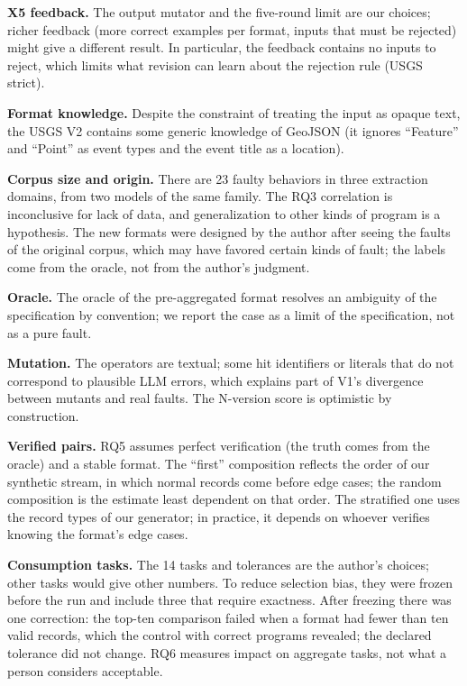 \documentclass[sigconf,nonacm]{acmart}
\begin{document}
\textbf{X5 feedback.} The output mutator and the five-round limit are our choices; richer feedback (more correct examples per format, inputs that must be rejected) might give a different result. In particular, the feedback contains no inputs to reject, which limits what revision can learn about the rejection rule (USGS strict).

\textbf{Format knowledge.} Despite the constraint of treating the input as opaque text, the USGS V2 contains some generic knowledge of GeoJSON (it ignores ``Feature'' and ``Point'' as event types and the event title as a location).

\textbf{Corpus size and origin.} There are 23 faulty behaviors in three extraction domains, from two models of the same family. The RQ3 correlation is inconclusive for lack of data, and generalization to other kinds of program is a hypothesis. The new formats were designed by the author after seeing the faults of the original corpus, which may have favored certain kinds of fault; the labels come from the oracle, not from the author's judgment.

\textbf{Oracle.} The oracle of the pre-aggregated format resolves an ambiguity of the specification by convention; we report the case as a limit of the specification, not as a pure fault.

\textbf{Mutation.} The operators are textual; some hit identifiers or literals that do not correspond to plausible LLM errors, which explains part of V1's divergence between mutants and real faults. The N-version score is optimistic by construction.

\textbf{Verified pairs.} RQ5 assumes perfect verification (the truth comes from the oracle) and a stable format. The ``first'' composition reflects the order of our synthetic stream, in which normal records come before edge cases; the random composition is the estimate least dependent on that order. The stratified one uses the record types of our generator; in practice, it depends on whoever verifies knowing the format's edge cases.

\textbf{Consumption tasks.} The 14 tasks and tolerances are the author's choices; other tasks would give other numbers. To reduce selection bias, they were frozen before the run and include three that require exactness. After freezing there was one correction: the top-ten comparison failed when a format had fewer than ten valid records, which the control with correct programs revealed; the declared tolerance did not change. RQ6 measures impact on aggregate tasks, not what a person considers acceptable.
\end{document}
